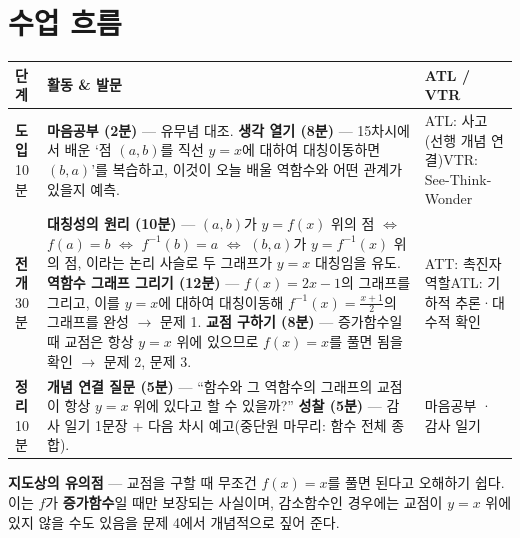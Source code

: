\documentclass[11pt,a4paper]{article}
\begin{document}
\section{수업 흐름}
\begin{tabularx}{\linewidth}{@{}>{\centering\arraybackslash}p{1.6cm}X>{\raggedright\arraybackslash\small}p{3.1cm}@{}}
\toprule
\textbf{단계} & \textbf{활동 \& 발문} & \textbf{ATL / VTR} \\
\midrule
\textcolor{goldstrong}{\textbf{도입}}\newline\footnotesize 10분 &
\textbf{마음공부 (2분)} --- 유무념 대조.\newline
\textbf{생각 열기 (8분)} --- 15차시에서 배운 `점 $(a,b)$를 직선 $y=x$에 대하여 대칭이동하면 $(b,a)$'를 복습하고, 이것이 오늘 배울 역함수와 어떤 관계가 있을지 예측. &
ATL: 사고(선행 개념 연결)\newline VTR: See-Think-Wonder \\
\addlinespace
\textcolor{goldstrong}{\textbf{전개}}\newline\footnotesize 30분 &
\textbf{대칭성의 원리 (10분)} --- $(a,b)$가 $y=f(x)$ 위의 점 $\iff$ $f(a)=b$ $\iff$ $f^{-1}(b)=a$ $\iff$ $(b,a)$가 $y=f^{-1}(x)$ 위의 점, 이라는 논리 사슬로 두 그래프가 $y=x$ 대칭임을 유도.\newline
\textbf{역함수 그래프 그리기 (12분)} --- $f(x)=2x-1$의 그래프를 그리고, 이를 $y=x$에 대하여 대칭이동해 $f^{-1}(x)=\frac{x+1}{2}$의 그래프를 완성 $\to$ 문제 1.\newline
\textbf{교점 구하기 (8분)} --- 증가함수일 때 교점은 항상 $y=x$ 위에 있으므로 $f(x)=x$를 풀면 됨을 확인 $\to$ 문제 2, 문제 3. &
ATT: 촉진자 역할\newline ATL: 기하적 추론·대수적 확인 \\
\addlinespace
\textcolor{goldstrong}{\textbf{정리}}\newline\footnotesize 10분 &
\textbf{개념 연결 질문 (5분)} --- ``함수와 그 역함수의 그래프의 교점이 항상 $y=x$ 위에 있다고 할 수 있을까?''\newline
\textbf{성찰 (5분)} --- 감사 일기 1문장 + 다음 차시 예고(중단원 마무리: 함수 전체 종합). &
마음공부 · 감사 일기 \\
\bottomrule
\end{tabularx}

\begin{calloutbox}
\textbf{지도상의 유의점} --- 교점을 구할 때 무조건 $f(x)=x$를 풀면 된다고 오해하기 쉽다. 이는 $f$가 \textbf{증가함수}일 때만 보장되는 사실이며, 감소함수인 경우에는 교점이 $y=x$ 위에 있지 않을 수도 있음을 문제 4에서 개념적으로 짚어 준다.
\end{calloutbox}
\end{document}
